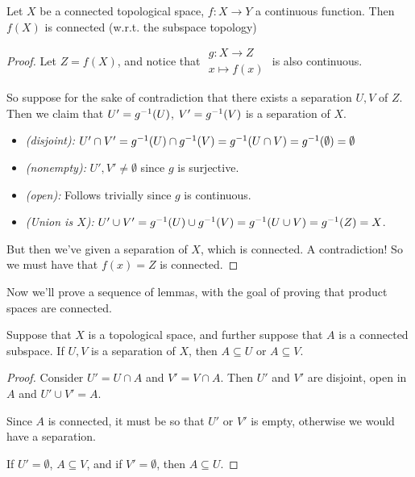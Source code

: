 \documentclass[12pt, twosided]{article}
\begin{document}
\begin{thm}
  Let \(X\) be a connected topological space, \(f: X \to Y\) a continuous function. Then \(f(X)\) is connected (w.r.t. the subspace topology)
\end{thm}
\begin{proof}
  Let \(Z = f(X)\), and notice that \(
  \begin{matrix}
    g: X \to Z \\ x \mapsto f(x)
  \end{matrix}
  \) is also continuous.

  So suppose for the sake of contradiction that there exists a separation \(U, V\) of \(Z\). Then we claim that \(U\prime = g\1(U)\), \(V\prime = g\1(V)\) is a separation of \(X\).
  \begin{itemize}
  \item \textit{(disjoint):} \(U\prime \cap V\prime = g\1(U) \cap g\1(V) = g\1(U \cap V) = g\1(\emptyset) = \emptyset\)
  \item \textit{(nonempty):} \(U\prime, V\prime \neq \emptyset\) since \(g\) is surjective.
  \item \textit{(open):} Follows trivially since \(g\) is continuous.
  \item \textit{(Union is \(X\)):} \(U\prime \cup V\prime = g\1(U) \cup g\1(V) = g\1(U \cup V) = g\1(Z) = X\).
  \end{itemize}

  But then we've given a separation of \(X\), which is connected. A contradiction! So we must have that \(f(x) = Z\) is connected.
\end{proof}

Now we'll prove a sequence of lemmas, with the goal of proving that product spaces are connected.

\begin{lm}
  Suppose that \(X\) is a topological space, and further suppose that \(A\) is a connected subspace. If \(U, V\) is a separation of \(X\), then \(A \subseteq U\) or \(A \subseteq V\).
\end{lm}
\begin{proof}
  Consider \(U\prime = U \cap A\) and \(V\prime = V \cap A\). Then \(U\prime\) and \(V\prime\) are disjoint, open in \(A\) and \(U\prime \cup V\prime = A\).

  Since \(A\) is connected, it must be so that \(U\prime\) or \(V\prime\) is empty, otherwise we would have a separation.

  If \(U\prime = \emptyset\), \(A \subseteq V\), and if \(V\prime = \emptyset\), then \(A \subseteq U\).
\end{proof}
\end{document}
